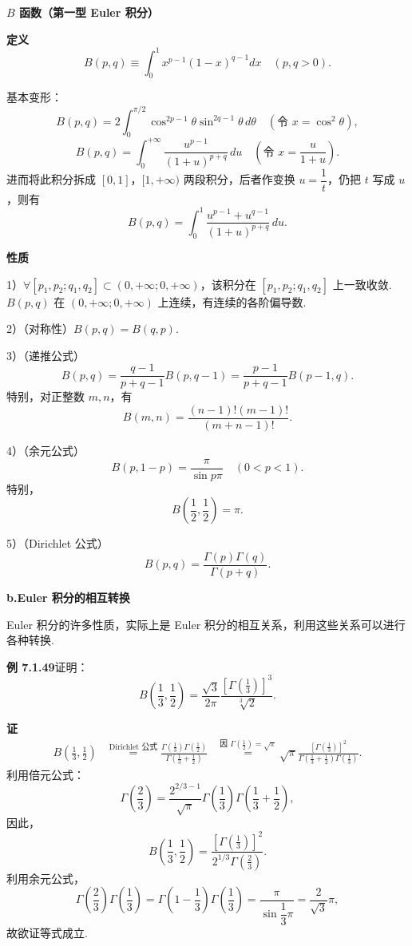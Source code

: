 \documentclass[UTF8,12pt,a4paper,fontset=fandol]{ctexart}
\begin{document}
\noindent\textbf{$B$ 函数（第一型 Euler 积分）}

\noindent\textbf{定义}\quad
\[
B(p,q)\equiv\int_0^1x^{p-1}(1-x)^{q-1}dx\quad(p,q>0).
\]

\noindent 基本变形：
\[
B(p,q)=2\int_0^{\pi/2}\cos^{2p-1}\theta\sin^{2q-1}\theta\,d\theta
\quad(\text{令 }x=\cos^2\theta),
\]
\[
B(p,q)=\int_0^{+\infty}\frac{u^{p-1}}{(1+u)^{p+q}}\,du
\quad\left(\text{令 }x=\frac{u}{1+u}\right).
\]
进而将此积分拆成 $[0,1]$，$[1,+\infty)$ 两段积分，后者作变换 $u=\dfrac1t$，仍把 $t$ 写成 $u$，则有
\[
B(p,q)=\int_0^1\frac{u^{p-1}+u^{q-1}}{(1+u)^{p+q}}\,du.
\]

\noindent\textbf{性质}\quad

1）$\forall [p_1,p_2;q_1,q_2]\subset(0,+\infty;0,+\infty)$，该积分在 $[p_1,p_2;q_1,q_2]$ 上一致收敛. $B(p,q)$ 在 $(0,+\infty;0,+\infty)$ 上连续，有连续的各阶偏导数.

2）（对称性）$B(p,q)=B(q,p)$.

3）（递推公式）
\[
B(p,q)=\frac{q-1}{p+q-1}B(p,q-1)=\frac{p-1}{p+q-1}B(p-1,q).
\]
特别，对正整数 $m,n$，有
\[
B(m,n)=\frac{(n-1)!(m-1)!}{(m+n-1)!}.
\]

4）（余元公式）
\[
B(p,1-p)=\frac{\pi}{\sin p\pi}\quad(0<p<1).
\]
特别，
\[
B\left(\frac12,\frac12\right)=\pi.
\]

5）（Dirichlet 公式）
\[
B(p,q)=\frac{\Gamma(p)\Gamma(q)}{\Gamma(p+q)}.
\]

\noindent\textbf{b.\quad Euler 积分的相互转换}

Euler 积分的许多性质，实际上是 Euler 积分的相互关系，利用这些关系可以进行各种转换.

\noindent\textbf{例 7.1.49}\quad 证明：
\[
B\left(\frac13,\frac12\right)=
\frac{\sqrt3}{2\pi}\frac{\left[\Gamma\left(\frac13\right)\right]^3}{\sqrt[3]{2}}.
\]

\noindent\textbf{证}\quad
\[
\begin{aligned}
B\left(\frac13,\frac12\right)
&\overset{\text{Dirichlet 公式}}{=}
\frac{\Gamma\left(\frac13\right)\Gamma\left(\frac12\right)}
{\Gamma\left(\frac13+\frac12\right)}
&\overset{\text{因 }\Gamma\left(\frac12\right)=\sqrt\pi}{=}
\sqrt\pi\frac{\left[\Gamma\left(\frac13\right)\right]^2}
{\Gamma\left(\frac13+\frac12\right)\Gamma\left(\frac13\right)}.
\end{aligned}
\]
利用倍元公式：
\[
\Gamma\left(\frac23\right)
=\frac{2^{2/3-1}}{\sqrt\pi}\Gamma\left(\frac13\right)\Gamma\left(\frac13+\frac12\right),
\]
因此，
\[
B\left(\frac13,\frac12\right)=
\frac{\left[\Gamma\left(\frac13\right)\right]^2}{2^{1/3}\Gamma\left(\frac23\right)}.
\]
利用余元公式，
\[
\Gamma\left(\frac23\right)\Gamma\left(\frac13\right)
=\Gamma\left(1-\frac13\right)\Gamma\left(\frac13\right)
=\frac{\pi}{\sin\dfrac13\pi}=\frac{2}{\sqrt3}\pi,
\]
故欲证等式成立.
\end{document}
